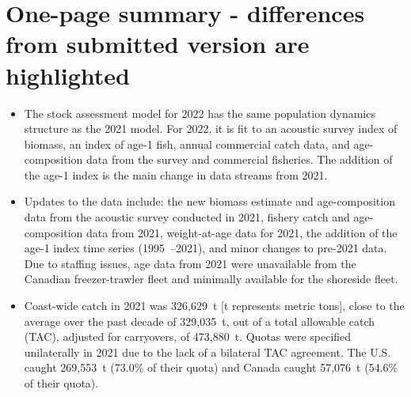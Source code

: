 \documentclass[12pt]{book}\usepackage[]{graphicx}\usepackage[]{color}
\begin{document}
\clearpage
\section*{One-page summary - differences from submitted version are highlighted}
 {}

\begin{itemize}
  \item The stock assessment model for 2022 has the same population
    dynamics structure as the 2021 model. For 2022,
    it is fit to an acoustic survey index of biomass, an index of age-1 fish, annual
    commercial catch data, and age-composition data from the survey and commercial fisheries.
    The addition of the age-1 index is the main change in data streams from 2021.


  \item Updates to the data include:
    the new biomass estimate and age-composition data from the acoustic survey conducted in 2021,
    fishery catch and age-composition data from 2021, weight-at-age data for
    2021, the addition of the age-1 index time series
    (1995~--2021), and minor changes to pre-2021 data. Due to
    staffing issues, age data from 2021 were unavailable from the Canadian freezer-trawler fleet and minimally
    available for the shoreside fleet.

  \item Coast-wide catch in 2021 was 326,629~t
    [t represents metric tons], close to the average over the past decade of
    329,035~t,
    out of a total allowable catch (TAC), adjusted for carryovers, of 473,880~t.
    Quotas were specified unilaterally in 2021 due to the lack of a
    bilateral TAC agreement. The U.S. caught 269,553~t (73.0\%
    of their quota) and Canada caught 57,076~t
    (54.6\% of their quota).


\end{itemize}
\end{document}
